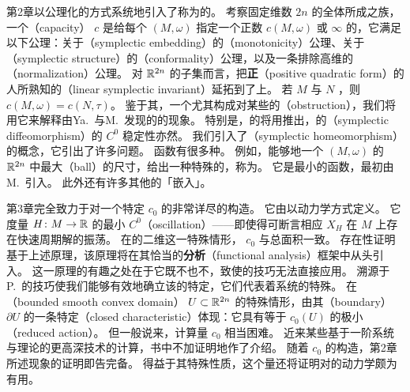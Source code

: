 第2章以公理化的方式系统地引入了称为\trSymplecticCapacity{}的\trSymplecticInvariant。
考察固定维数 $2n$ 的\trSymplecticManifold{}全体所成之族，一个\textbf{\trCapacity}（capacity） $c$ 是给每个\trSymplecticManifold{} $(M,\omega)$ 指定一个正数 $c(M,\omega)$ 或 $\infty$ 的\trMapping，它满足以下公理：关于\textbf{\trSymplecticEmbedding}（symplectic embedding）的\textbf{\trMonotonicity}（monotonicity）公理、关于\textbf{\trSymplecticStructure}（symplectic structure）的\textbf{\trConformality}（conformality）公理，以及一条排除高维\trVolume{}的\textbf{\trNormalization}（normalization）公理。
对 $\mathbb{R}^{2n}$ 的子集而言，\trCapacity{}把\textbf{正\trQuadraticForm}（positive quadratic form）的人所熟知的\trLinear\trSymplecticInvariant{}（linear symplectic invariant）延拓到了\trNonlinear\trSymplecticMapping{}上。
若 $M$ 与 $N$ \trSymplectic\trDiffeomorphism{}，则 $c(M,\omega)=c(N,\tau)$。
鉴于其\trMonotonicity，一个\trCapacity{}尤其构成对某些\trSymplecticEmbedding{}的\textbf{\trObstruction}（obstruction），我们将用它来解释由Ya.~\trEliashberg{}与M.~\trGromov{}发现的\trSymplecticEmbedding{}的\trRigidity{}现象。
特别是，\trGromov{}的\trSqueezingTheorem{}将用\trCapacity{}推出，\trEliashberg{}的\textbf{\trSymplectic\trDiffeomorphism}（symplectic diffeomorphism）的 $C^0$ 稳定性亦然。
我们引入了\textbf{\trSymplecticHomeomorphism}（symplectic homeomorphism）的概念，它引出了许多问题。
\trCapacity{}函数有很多种。
例如，能够\trSymplectic{}地\trEmbedding{}一个\trSymplecticManifold{} $(M,\omega)$ 的 $\mathbb{R}^{2n}$ 中最大\textbf{\trBall}（ball）的尺寸，给出一种特殊的\trCapacity{}，称为\trGromovWidth。
它是最小的\trCapacity{}函数，最初由M.~\trGromov{}引入。
此外还有许多其他的「嵌入」\trCapacity{}。

第3章完全致力于对一个特定\trSymplecticCapacity{} $c_0$ 的非常详尽的构造。
它由\trHamiltonianSystem{}以动力学方式定义。
它度量\trHamiltonianFunction{} $H\colon M\to\mathbb{R}$ 的最小 $C^{0}$\textbf{\trOscillation}（oscillation）——即使得可断言相应 $X_H$ 在 $M$ 上存在快速周期解的振荡。
在\trConnected{}的二维\trSymplecticManifold{}这一特殊情形，\trCapacity{} $c_0$ 与总面积一致。
存在性证明基于上述\trAction{}原理，该原理将在其恰当的\textbf{\trFunctional{}分析}（functional analysis）框架中从头引入。
这一原理的有趣之处在于它既不\trBoundedBelow{}也不\trBoundedAbove，致使\trStandard{}的\trVariational{}技巧无法直接应用。
溯源于P.~\trRabinowitz{}的技巧使我们能够有效地确立该\trFunctional{}的特定\trSaddlePoint{}，它们代表着系统的特殊\trPeriodicSolution。
在\textbf{\trBounded{}\trSmooth\trConvex\trDomain}（bounded smooth convex domain） $U\subset\mathbb{R}^{2n}$ 的特殊情形，\trCapacity{}由其\textbf{\trBoundary}（boundary） $\partial U$ 的一条特定\textbf{\trClosedCharacteristic}（closed characteristic）体现：它具有等于 $c_0(U)$ 的极小\textbf{\trReducedAction}（reduced action）。
但一般说来，计算\trInvariant{}量 $c_0$ 相当困难。
近来某些基于一阶\trElliptic{}系统与\trFredholm{}理论的更高深技术的计算，书中不加证明地作了介绍。
随着\trCapacity{} $c_0$ 的构造，第2章所述\trRigidity{}现象的证明即告完备。
得益于其特殊性质，这个\trInvariant{}量还将证明对\trHamiltonianSystem{}的动力学颇为有用。

